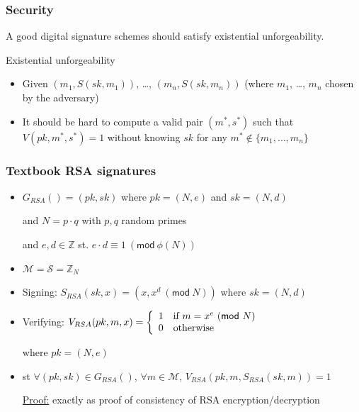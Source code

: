 \documentclass[aspectratio=169, lualatex,  10pt,dvipsnames,svgnames]{beamer} %
\def\enrouge#1{\textcolor{rouge}{#1}}
\newcommand{\Mcal}{\mathcal{M}}
\begin{document}
\begin{frame}
  \frametitle{Security}

  A good digital signature schemes should satisfy existential unforgeability.

  \begin{block}{Existential unforgeability}
    \begin{itemize}
    \item Given $(m_1, S(sk, m_1))$, \dots, $(m_n, S(sk, m_n))$ (where $m_1$, \dots, $m_n$ chosen by the adversary)
    \item It should be hard to compute a valid pair \enrouge{$(m^*, s^*)$} such that $V(pk,m^*,s^*)=1$ without knowing $sk$ for any $m^*\not\in\{m_1, \dots, m_n\} $
    \end{itemize}
  \end{block}

\end{frame}

\begin{frame}
  \frametitle{Textbook RSA signatures}

    \begin{itemize}
  \item $G_{RSA}() = (pk, sk)$ \hfill where $pk=(N, e)$ and $sk=(N,d)$

    \hfill and $N = p\cdot q$ with $p, q$ random primes

    \hfill and $e, d \in \mathbb Z$ st. $e\cdot d \equiv 1\ (\mathsf{mod}\ \phi(N))$
    \smallskip{}
    \pause

  \item $\Mcal = \mathcal{S} = \mathbb Z_N$
   \smallskip{}
    \pause

  \item Signing: $S_{RSA}(sk, x) = (x, x^d\ (\mathsf{mod}\ N))$ \hfill where $sk=(N,d)$
    \smallskip{}
    \pause

  \item Verifying: $V_{RSA}(pk, m, x) = \left\{
    \begin{array}[c]{ll}
      1 & \text{if } m = x^e\ (\mathsf{mod}\ N) \\
      0 & \text{otherwise}
    \end{array}
    \right.$
    
    where $pk=(N,e)$ 
    \smallskip{}
    \pause

  \item st $\forall (pk, sk) \in G_{RSA}()$, $\forall m \in \Mcal$, $V_{RSA}(pk, m, S_{RSA}(sk, m)) = 1$
    \pause

    \underline{Proof:} exactly as proof of consistency of RSA encryption/decryption
  \end{itemize}
\end{frame}
\end{document}
